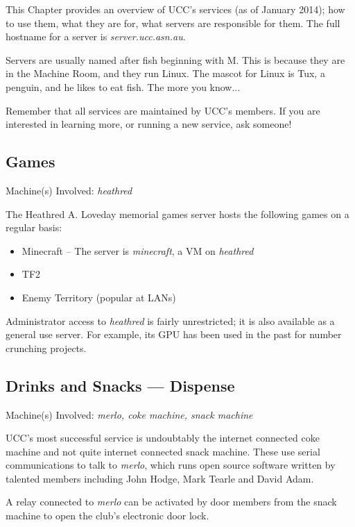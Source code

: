 
\newcommand{\server}[1]{\emph{#1}}

\begin{mdframed}
This Chapter provides an overview of UCC's services (as of January 2014); how to use them, what they are for, what servers are responsible for them. The full hostname for a server is \server{server.ucc.asn.au}.

 Servers are usually named after fish beginning with M. This is because they are in the Machine Room, and they run Linux. The mascot for Linux is Tux, a penguin, and he likes to eat fish. The more you know...


Remember that all services are maintained by UCC's members. If you are interested in learning more, or running a new service, ask someone!


\end{mdframed}

\newenvironment{uccservice}[2]
{
	\begin{mdframed}
	\section{#1}
	\begin{mdframed}
		Machine(s) Involved: \server{#2}
	\end{mdframed}

	
}{\end{mdframed}}

\begin{uccservice}{Games}{heathred}

The Heathred A. Loveday memorial games server hosts the following games on a regular basis:
\begin{itemize}
	\item Minecraft -- The server is \server{minecraft}, a VM on \server{heathred}
	\item TF2
	\item Enemy Territory (popular at LANs)
\end{itemize}


Administrator access to \server{heathred} is fairly unrestricted; it is also available as a general use server. For example, its GPU has been used in the past for number crunching projects.

\end{uccservice}



\begin{uccservice}{Drinks and Snacks --- Dispense}{merlo, coke machine, snack machine}

UCC's most successful service is undoubtably the internet connected coke machine and not quite internet connected snack machine. These use serial communications to talk to \server{merlo}, which runs open source software written by talented members including John Hodge, Mark Tearle and David Adam. 

A relay connected to \server{merlo} can be activated by door members from the snack machine to open the club's electronic door lock.

\end{uccservice}

